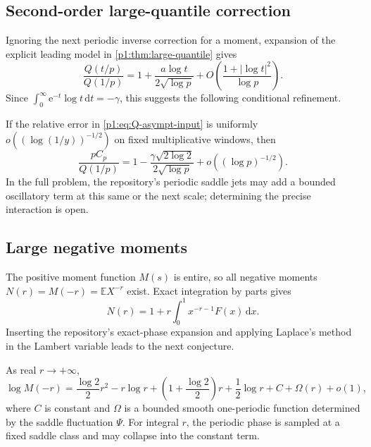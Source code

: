 \documentclass[11pt,oneside]{article}
\theoremstyle{definition}
\theoremstyle{remark}
\newcommand{\E}{\mathbb E}
\newcommand{\dd}{\,\mathrm d}
\newcommand{\e}{\mathrm e}
\newcommand{\1}{\mathbf 1}
\begin{document}
\subsection{Second-order large-quantile correction}
Ignoring the next periodic inverse correction for a moment, expansion of the
explicit leading model in \cref{p1:thm:large-quantile} gives
\[
 \frac{Q(t/p)}{Q(1/p)}
 =1+\frac{a\log t}{2\sqrt{\log p}}+O\!\left(\frac{1+|\log t|^2}{\log p}\right).
\]
Since \(\int_0^\infty\e^{-t}\log t\dd t=-\gamma\), this suggests the
following conditional refinement.

\begin{conjecture}
\label{p1:conj:quantile-second}
If the relative error in \eqref{p1:eq:Q-asympt-input} is uniformly
\(o((\log(1/y))^{-1/2})\) on fixed multiplicative windows, then
\begin{equation}
 \frac{pC_p}{Q(1/p)}
 =1-\frac{\gamma\sqrt{2\log2}}{2\sqrt{\log p}}
 +o((\log p)^{-1/2}).                                         \label{p1:eq:conj-quantile-second}
\end{equation}
In the full problem, the repository's periodic saddle jets may add a bounded
oscillatory term at this same or the next scale; determining the precise
interaction is open.
\end{conjecture}

\subsection{Large negative moments}
The positive moment function \(M(s)\) is entire, so all negative moments
\(N(r)=M(-r)=\E X^{-r}\) exist.  Exact integration by parts gives
\begin{equation}
 N(r)=1+r\int_0^1x^{-r-1}F(x)\dd x.                            \label{p1:eq:negative-moment-exact}
\end{equation}
Inserting the repository's exact-phase expansion and applying Laplace's method
in the Lambert variable leads to the next conjecture.

\begin{conjecture}\label{p1:conj:negative-moments}
As real \(r\to+\infty\),
\begin{equation}
 \log M(-r)
 =\frac{\log2}{2}r^2-r\log r
 +\left(1+\frac{\log2}{2}\right)r
 +\frac12\log r+C+\Omega(r)+o(1),                              \label{p1:eq:conj-negative-moment}
\end{equation}
where \(C\) is constant and \(\Omega\) is a bounded smooth one-periodic
function determined by the saddle fluctuation \(\Psi\).  For integral \(r\),
the periodic phase is sampled at a fixed saddle class and may collapse into
the constant term.
\end{conjecture}
\end{document}

